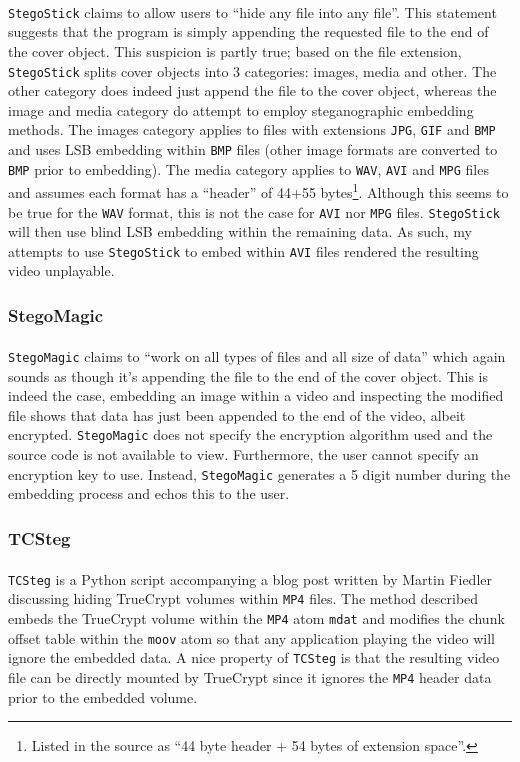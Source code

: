 \documentclass[paper=a4, fontsize=11pt,twoside]{scrartcl}
\numberwithin{table}{section}
\numberwithin{figure}{section}
\numberwithin{algorithm}{section}
\begin{document}
\texttt{StegoStick}\textsuperscript{\cite{stegostick}} claims to allow users to ``hide any file into any file''. This statement suggests that the program is simply appending the requested file to the end of the cover object. This suspicion is partly true; based on the file extension, \texttt{StegoStick} splits cover objects into 3 categories: images, media and other. The other category does indeed just append the file to the cover object, whereas the image and media category do attempt to employ steganographic embedding methods. The images category applies to files with extensions \texttt{JPG}, \texttt{GIF} and \texttt{BMP} and uses LSB embedding within \texttt{BMP} files (other image formats are converted to \texttt{BMP} prior to embedding). The media category applies to \texttt{WAV}, \texttt{AVI} and \texttt{MPG} files and assumes each format has a ``header'' of 44+55 bytes\footnote{Listed in the source as ``44 byte header + 54 bytes of extension space''.}. Although this seems to be true for the \texttt{WAV} format, this is not the case for \texttt{AVI} nor \texttt{MPG} files. \texttt{StegoStick} will then use blind LSB embedding within the remaining data. As such, my attempts to use \texttt{StegoStick} to embed within \texttt{AVI} files rendered the resulting video unplayable. %

\subsubsection{StegoMagic}

\texttt{StegoMagic}\textsuperscript{\cite{stegomagic}} claims to ``work on all types of files and all size of data'' which again sounds as though it's appending the file to the end of the cover object. This is indeed the case, embedding an image within a video and inspecting the modified file shows that data has just been appended to the end of the video, albeit encrypted. \texttt{StegoMagic} does not specify the encryption algorithm used and the source code is not available to view. Furthermore, the user cannot specify an encryption key to use. Instead, \texttt{StegoMagic} generates a 5 digit number during the embedding process and echos this to the user.  

\subsubsection{TCSteg}

\texttt{TCSteg}\textsuperscript{\cite{tcsteg}} is a Python script accompanying a blog post written by Martin Fiedler discussing hiding TrueCrypt volumes within \texttt{MP4} files. The method described embeds the TrueCrypt volume within the \texttt{MP4} atom \texttt{mdat} and modifies the chunk offset table within the \texttt{moov} atom so that any application playing the video will ignore the embedded data. A nice property of \texttt{TCSteg} is that the resulting video file can be directly mounted by TrueCrypt since it ignores the \texttt{MP4} header data prior to the embedded volume.\\
\end{document}
